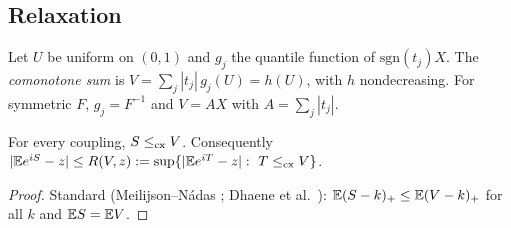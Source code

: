 \documentclass[11pt]{amsart}
\theoremstyle{definition}\newtheorem{definition}[theorem]{Definition}\theoremstyle{remark}\newtheorem{remark}[theorem]{Remark}
\begin{document}
\subsection{Relaxation}
Let $U$ be uniform on $(0,1)$ and $g_j$ the quantile function of $\mathrm{sgn}(t_j)X$. The \emph{comonotone sum} is $V=\sum_j|t_j|\,g_j(U)=h(U)$, with $h$
nondecreasing. For symmetric $F$, $g_j=F^{-1}$ and $V=AX$ with $A=\sum_j|t_j|$.
\begin{lemma}\label{lem:como}
For every coupling, $S\le_{\mathrm{cx}} V$. Consequently $|\mathbb E e^{iS}-z|\le R(V,z):=\sup\{|\mathbb E e^{iT}-z|:\ T\le_{\mathrm{cx}} V\}$.
\end{lemma}
\begin{proof}Standard (Meilijson--N\'adas \cite{MN79}; Dhaene et al.\ \cite{Dh02}): $\mathbb E(S-k)_+\le\mathbb E(V-k)_+$ for all $k$ and $\mathbb E S=\mathbb E V$.\end{proof}
\end{document}
